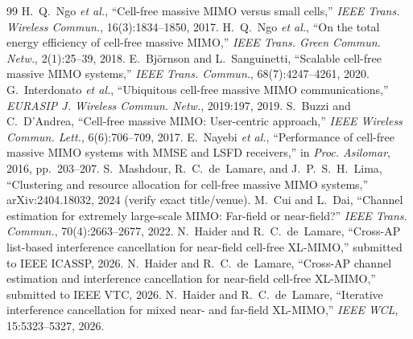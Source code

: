 \documentclass[11pt]{article}
\begin{document}
\begin{thebibliography}{99}\small
{} H.~Q.~Ngo \emph{et al.}, ``Cell-free massive MIMO versus small cells,'' \emph{IEEE Trans. Wireless Commun.}, 16(3):1834--1850, 2017.
 H.~Q.~Ngo \emph{et al.}, ``On the total energy efficiency of cell-free massive MIMO,'' \emph{IEEE Trans. Green Commun. Netw.}, 2(1):25--39, 2018.
 E.~Bj\"ornson and L.~Sanguinetti, ``Scalable cell-free massive MIMO systems,'' \emph{IEEE Trans. Commun.}, 68(7):4247--4261, 2020.
 G.~Interdonato \emph{et al.}, ``Ubiquitous cell-free massive MIMO communications,'' \emph{EURASIP J. Wireless Commun. Netw.}, 2019:197, 2019.
 S.~Buzzi and C.~D'Andrea, ``Cell-free massive MIMO: User-centric approach,'' \emph{IEEE Wireless Commun. Lett.}, 6(6):706--709, 2017.
 E.~Nayebi \emph{et al.}, ``Performance of cell-free massive MIMO systems with MMSE and LSFD receivers,'' in \emph{Proc. Asilomar}, 2016, pp.~203--207.
 S.~Mashdour, R.~C.~de~Lamare, and J.~P.~S.~H.~Lima, ``Clustering and resource allocation for cell-free massive MIMO systems,'' arXiv:2404.18032, 2024 (verify exact title/venue).
 M.~Cui and L.~Dai, ``Channel estimation for extremely large-scale MIMO: Far-field or near-field?'' \emph{IEEE Trans. Commun.}, 70(4):2663--2677, 2022.
 N.~Haider and R.~C.~de~Lamare, ``Cross-AP list-based interference cancellation for near-field cell-free XL-MIMO,'' submitted to IEEE ICASSP, 2026.
 N.~Haider and R.~C.~de~Lamare, ``Cross-AP channel estimation and interference cancellation for near-field cell-free XL-MIMO,'' submitted to IEEE VTC, 2026.
 N.~Haider and R.~C.~de~Lamare, ``Iterative interference cancellation for mixed near- and far-field XL-MIMO,'' \emph{IEEE WCL}, 15:5323--5327, 2026.
\end{thebibliography}
\end{document}

